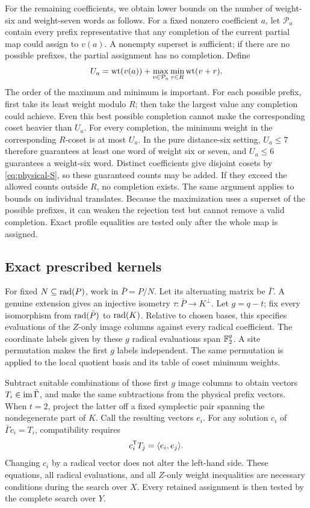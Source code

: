 For the remaining coefficients, we obtain lower bounds on the number
of weight-six and weight-seven words as follows.
For a fixed nonzero coefficient \(a\), let \(\mathcal P_a\) contain
every prefix representative that any completion of the current partial
map could assign to \(v(a)\). A nonempty superset is sufficient; if
there are no possible prefixes, the partial assignment has no completion.
Define
\[
 U_a=\operatorname{wt}(v(a))+\max_{v\in\mathcal P_a}\min_{r\in R}\operatorname{wt}(v+r).
\]
The order of the maximum and minimum is important. For each possible
prefix, first take its least weight modulo \(R\); then take the
largest value any completion could achieve. Even this best possible
completion cannot make the corresponding coset heavier than \(U_a\).
For every completion, the minimum weight in the corresponding
\(R\)-coset is at most \(U_a\). In the pure distance-six setting,
\(U_a\leq7\)
therefore guarantees at least one word of weight six or seven, and
\(U_a\leq6\) guarantees a weight-six word. Distinct coefficients
give disjoint cosets by \eqref{eq:physical-S}, so these guaranteed
counts may be added. If they exceed the allowed counts outside \(R\),
no completion exists. The same argument applies to bounds on individual
translates. Because the maximization uses a superset of the possible
prefixes, it can weaken the rejection test but cannot remove a valid
completion. Exact profile equalities are tested only after the whole
map is assigned.

\subsection{Exact prescribed kernels}\label{app:fixedkernel}

For fixed \(N\subseteq\operatorname{rad}(P)\), work in \(\bar P=P/N\).
Let its alternating matrix be \(\bar\Gamma\). A genuine extension
gives an injective isometry \(\tau:\bar P\to K^\perp\).
Let \(g=q-t\); fix every isomorphism from \(\operatorname{rad}(\bar P)\)
to \(\operatorname{rad}(K)\). Relative to chosen bases, this specifies evaluations
of the \(Z\)-only image columns against every radical coefficient.
The coordinate labels given by these \(g\) radical evaluations span
\(\mathbb F_2^g\). A site permutation makes the first \(g\) labels
independent. The same permutation is applied to the local quotient
basis and its table of coset minimum weights.

Subtract suitable combinations of those first \(g\) image columns
to obtain vectors \(T_i\in\operatorname{im}\bar\Gamma\), and make the same
subtractions from the physical prefix vectors. When \(t=2\), project
the latter off a fixed symplectic pair spanning the nondegenerate
part of \(K\). Call the resulting vectors \(e_i\).
For any solution \(c_i\) of \(\bar\Gamma c_i=T_i\), compatibility
requires
\[
 c_i^\mathsf T T_j=\langle e_i,e_j\rangle.
\]
Changing \(c_i\) by a radical vector does not alter the left-hand
side. These equations, all radical evaluations, and all \(Z\)-only
weight inequalities are necessary conditions during the search over
\(X\). Every retained assignment is then tested by the complete search
over \(Y\).

